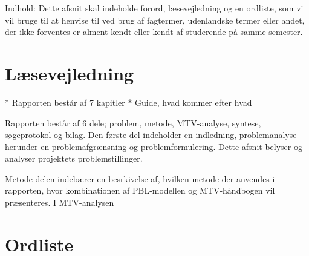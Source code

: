Indhold: Dette afsnit skal indeholde forord, 
læsevejledning og en ordliste, som vi vil bruge til at henvise til ved brug af fagtermer, udenlandske termer eller andet, der ikke forventes er alment kendt eller kendt af studerende på samme semester. 




\section{Læsevejledning}

* Rapporten består af 7 kapitler 
* Guide, hvad kommer efter hvad

Rapporten består af 6 dele; problem, metode, MTV-analyse, syntese, søgeprotokol og bilag. Den første del indeholder en indledning, problemanalyse herunder en problemafgrænsning og problemformulering. Dette afsnit belyser og analyser projektets problemstillinger.

Metode delen indebærer en besrkivelse af, hvilken metode der anvendes i rapporten, hvor kombinationen af PBL-modellen og MTV-håndbogen vil præsenteres. I MTV-analysen 



\section{Ordliste}